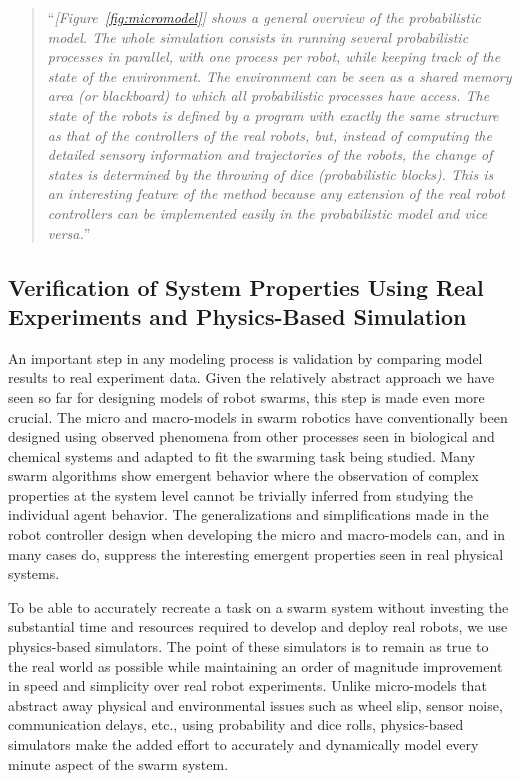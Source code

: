 \documentclass[Main.tex]{subfiles}
\begin{document}
\begin{quote}
``\emph{[Figure~\ref{fig:micromodel}] shows a general overview of the probabilistic model. The whole simulation consists in running several probabilistic processes in parallel, with one process per robot, while keeping track of the state of the environment. The environment can be seen as a shared memory area (or blackboard) to which all probabilistic processes have access. The state of the robots is defined by a program with exactly the same structure as that of the controllers of the real robots, but, instead of computing the detailed sensory information and trajectories of the robots, the change of states is determined by the throwing of dice (probabilistic blocks). This is an interesting feature of the method because any extension of the real robot controllers can be implemented easily in the probabilistic model and vice versa.}''
\end{quote}


\subsection{Verification of System Properties Using Real Experiments and Physics-Based Simulation}
An important step in any modeling process is validation by comparing model results to real experiment data. Given the relatively abstract approach we have seen so far for designing models of robot swarms, this step is made even more crucial. The micro and macro-models in swarm robotics have conventionally been designed using observed phenomena from other processes seen in biological and chemical systems and adapted to fit the swarming task being studied. Many swarm algorithms show emergent behavior where the observation of complex properties at the system level cannot be trivially inferred from studying the individual agent behavior. The generalizations and simplifications made in the robot controller design when developing the micro and macro-models can, and in many cases do, suppress the interesting emergent properties seen in real physical systems. 

To be able to accurately recreate a task on a swarm system without investing the substantial time and resources required to develop and deploy real robots, we use physics-based simulators. The point of these simulators is to remain as true to the real world as possible while maintaining an order of magnitude improvement in speed and simplicity over real robot experiments. Unlike micro-models that abstract away physical and environmental issues such as wheel slip, sensor noise, communication delays, etc., using probability and dice rolls, physics-based simulators make the added effort to accurately and dynamically model every minute aspect of the swarm system.
\end{document}

